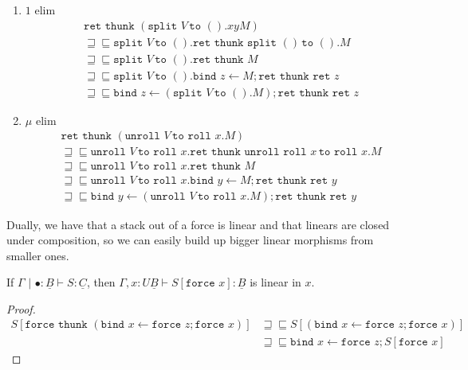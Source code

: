 \documentclass[acmsmall,screen,12pt]{acmart}
\renewcommand{\u}{\underline}
\newcommand{\pipe}{\,\,|\,\,}
\newcommand{\ltdyn}{\sqsubseteq}
\newcommand{\gtdyn}{\sqsupseteq}
\newcommand{\equidyn}{\mathrel{\gtdyn\ltdyn}}
\newcommand{\roll}{\kw{roll}}
\newcommand{\bindXtoYinZ}[2]{\kw{bind}#2 \leftarrow #1;}
\newcommand{\kw}[1]{\texttt{#1}\,\,}
\newcommand{\pmpairWtoXYinZ}[4]{\kw{split} #1\,\kw{to} (#2,#3). #4}
\newcommand{\pmpairWtoinZ}[2]{\kw{split} #1\,\kw{to} (). #2}
\newcommand{\pmmuXtoYinZ}[3]{\kw{unroll} #1 \,\kw{to} \roll #2. #3}
\newcommand{\ret}{\kw{ret}}
\newcommand{\thunk}{\kw{thunk}}
\newcommand{\force}{\kw{force}}
\begin{document}
{\begin{longonly}
\begin{longproof}
\begin{enumerate}
    \begin{align*}
      &\ret\thunk (\pmpairWtoXYinZ V x y M)\\
      &\equidyn \pmpairWtoXYinZ V x y \ret\thunk \pmpairWtoXYinZ {(x,y)} x y M\tag{$\times\eta$}\\
      &\equidyn \pmpairWtoXYinZ V x y \ret\thunk M\tag{$\times\beta$}\\
      &\equidyn \pmpairWtoXYinZ V x y \bindXtoYinZ M z \ret\thunk\ret z\tag{$M$ thunkable}\\
      &\equidyn \bindXtoYinZ {(\pmpairWtoXYinZ V x y M)} z \ret\thunk\ret z\tag{commuting conversion}
    \end{align*}
  \item $1$ elim
    \begin{align*}
      &\ret\thunk (\pmpairWtoinZ V x y M)\\
      &\equidyn \pmpairWtoinZ V \ret\thunk \pmpairWtoinZ {()} M\tag{$1\eta$}\\
      &\equidyn \pmpairWtoinZ V \ret\thunk M\tag{$1\beta$}\\
      &\equidyn \pmpairWtoinZ V \bindXtoYinZ M z \ret\thunk\ret z\tag{$M$ thunkable}\\
      &\equidyn \bindXtoYinZ {(\pmpairWtoinZ V M)} z \ret\thunk\ret z\tag{commuting conversion}
    \end{align*}  \item $\mu$ elim
    \begin{align*}
      &\ret\thunk (\pmmuXtoYinZ V x M)\\
      &\equidyn \pmmuXtoYinZ V x \ret\thunk \pmmuXtoYinZ {\roll x} x M\tag{$\mu\eta$}\\
      &\equidyn \pmmuXtoYinZ V x \ret\thunk M\tag{$\mu\beta$}\\
      &\equidyn \pmmuXtoYinZ V x \bindXtoYinZ M y \ret\thunk\ret y\tag{$M$ thunkable}\\
      &\equidyn \bindXtoYinZ {(\pmmuXtoYinZ V x M)} y \ret\thunk\ret y\tag{commuting conversion}
    \end{align*}
  \end{enumerate}
\end{longproof}

Dually, we have that a stack out of a force is linear and that linears
are closed under composition, so we can easily build up bigger linear
morphisms from smaller ones.
\begin{lemma}
  If $\Gamma \pipe \bullet : \u B \vdash S : \u C$, then
  $\Gamma , x : U\u B\vdash S[\force x] : \u B$ is linear in $x$.
\end{lemma}
\begin{proof}
  \begin{align*}
    S[\force \thunk {(\bindXtoYinZ {\force z} x \force x)}]
    &\equidyn
    S[{(\bindXtoYinZ {\force z} x \force x)}]\tag{$U\beta$}\\
    &\equidyn \bindXtoYinZ {\force z} x S[\force x] \tag{$\u F\eta$}
  \end{align*}
\end{proof}


\end{longonly}}
\end{document}

